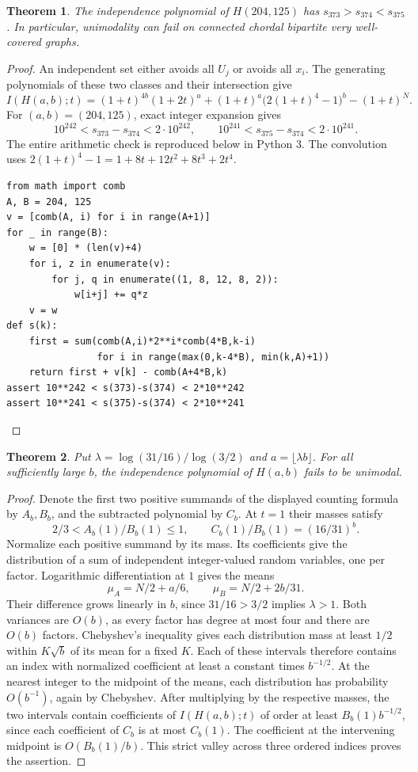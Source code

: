 \documentclass[11pt,a4paper]{article}
\newtheorem{theorem}{Theorem}[section]
\theoremstyle{remark}\newtheorem{remark}[theorem]{Remark}
\numberwithin{equation}{section}
\begin{document}
\begin{theorem}\label{thm:explicit-bipartite-valley}
The independence polynomial of $H(204,125)$ has
$s_{373}>s_{374}<s_{375}$. In particular, unimodality can fail on
connected chordal bipartite very well-covered graphs.
\end{theorem}
\begin{proof}
An independent set either avoids all $U_j$ or avoids all $x_i$.
The generating polynomials of these two classes and their intersection give
\[
 I(H(a,b);t)=(1+t)^{4b}(1+2t)^a
    +(1+t)^a\bigl(2(1+t)^4-1\bigr)^b-(1+t)^N.
\]
For $(a,b)=(204,125)$, exact integer expansion gives
\[
 10^{242}<s_{373}-s_{374}<2\cdot10^{242},\qquad
 10^{241}<s_{375}-s_{374}<2\cdot10^{241}.
\]
The entire arithmetic check is reproduced below in Python 3. The
convolution uses $2(1+t)^4-1=1+8t+12t^2+8t^3+2t^4$.
\begin{lstlisting}
from math import comb
A, B = 204, 125
v = [comb(A, i) for i in range(A+1)]
for _ in range(B):
    w = [0] * (len(v)+4)
    for i, z in enumerate(v):
        for j, q in enumerate((1, 8, 12, 8, 2)):
            w[i+j] += q*z
    v = w
def s(k):
    first = sum(comb(A,i)*2**i*comb(4*B,k-i)
                for i in range(max(0,k-4*B), min(k,A)+1))
    return first + v[k] - comb(A+4*B,k)
assert 10**242 < s(373)-s(374) < 2*10**242
assert 10**241 < s(375)-s(374) < 2*10**241
\end{lstlisting}
\end{proof}

\begin{theorem}\label{thm:bipartite-infinite}
Put $\lambda=\log(31/16)/\log(3/2)$ and $a=\lfloor\lambda b\rfloor$.
For all sufficiently large $b$, the independence polynomial of $H(a,b)$
fails to be unimodal.
\end{theorem}
\begin{proof}
Denote the first two positive summands of the displayed counting formula
by $A_b,B_b$, and the subtracted polynomial by $C_b$. At $t=1$ their
masses satisfy
\[
 2/3<A_b(1)/B_b(1)\le1,\qquad C_b(1)/B_b(1)=(16/31)^b.
\]
Normalize each positive summand by its mass. Its coefficients give the
distribution of a sum of independent integer-valued random variables,
one per factor. Logarithmic differentiation at $1$ gives the means
\[
 \mu_A=N/2+a/6,\qquad \mu_B=N/2+2b/31 .
\]
Their difference grows linearly in $b$, since $31/16>3/2$ implies
$\lambda>1$. Both variances are $O(b)$, as every factor has degree
at most four and there are $O(b)$ factors. Chebyshev's inequality gives
each distribution mass at least $1/2$ within $K\sqrt b$ of its mean
for a fixed $K$. Each of these intervals therefore contains an index
with normalized coefficient at least a constant times $b^{-1/2}$.
At the nearest integer to the midpoint of the means, each distribution
has probability $O(b^{-1})$, again by Chebyshev. After multiplying by
the respective masses, the two intervals contain coefficients of
$I(H(a,b);t)$ of order at least $B_b(1)b^{-1/2}$, since each coefficient
of $C_b$ is at most $C_b(1)$. The coefficient at the intervening midpoint
is $O(B_b(1)/b)$. This strict valley across three ordered indices proves
the assertion.
\end{proof}
\end{document}
